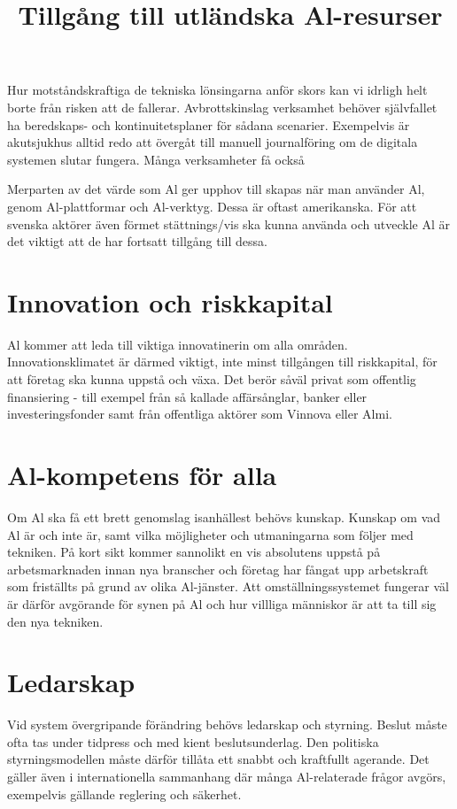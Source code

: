 {{{{{{{Hur motståndskraftiga de tekniska lönsingarna anför skors kan vi idrligh helt borte från risken att de fallerar. Avbrottskinslag verksamhet behöver självfallet ha beredskaps- och kontinuitetsplaner för sådana scenarier. Exempelvis är akutsjukhus alltid redo att övergåt till manuell journalföring om de digitala systemen slutar fungera. Många verksamheter få också

\title{
Tillgång till utländska Al-resurser
}
Merparten av det värde som Al ger upphov till skapas när man använder Al, genom Al-plattformar och Al-verktyg. Dessa är oftast amerikanska. För att svenska aktörer även förmet stättnings/vis ska kunna använda och utveckle Al är det viktigt att de har fortsatt tillgång till dessa.
\section*{Innovation och riskkapital}
Al kommer att leda till viktiga innovatinerin om alla områden. Innovationsklimatet är därmed viktigt, inte minst tillgången till riskkapital, för att företag ska kunna uppstå och växa. Det berör såväl privat som offentlig finansiering - till exempel från så kallade affärsånglar, banker eller investeringsfonder samt från offentliga aktörer som Vinnova eller Almi.
\section*{Al-kompetens för alla}
Om Al ska få ett brett genomslag isanhällest behövs kunskap. Kunskap om vad Al är och inte är, samt vilka möjligheter och utmaningarna som följer med tekniken. På kort sikt kommer sannolikt en vis absolutens uppstå på arbetsmarknaden innan nya branscher och företag har fångat upp arbetskraft som friställts på grund av olika Al-jänster. Att omställningssystemet fungerar väl är därför avgörande för synen på Al och hur villliga människor är att ta till sig den nya tekniken.
\section*{Ledarskap}
Vid system övergripande förändring behövs ledarskap och styrning. Beslut måste ofta tas under tidpress och med kient beslutsunderlag. Den politiska styrningsmodellen måste därför tillåta ett snabbt och kraftfullt agerande. Det gäller även i internationella sammanhang där många Al-relaterade frågor avgörs, exempelvis gällande reglering och säkerhet.
}}}}}}}
